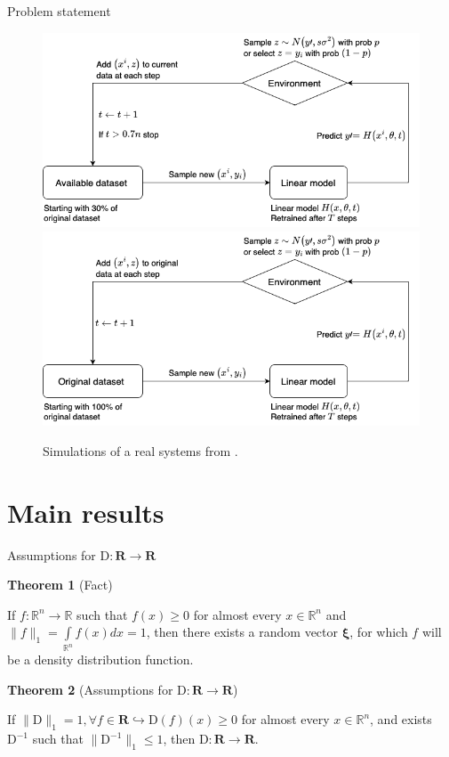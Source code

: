 \documentclass[aspectratio=169]{beamer}
\begin{document}
    \begin{frame}{Problem statement}
        \begin{figure}[h!]
            \centering
            \includegraphics[width=0.49\linewidth]{pictures/Hidden_loop.png}
            \includegraphics[width=0.49\linewidth]{pictures/Hidden_sample.png}\\
            
            \caption{Simulations of a real systems from \cite{khritankov2021hidden}.}
            \label{w}
        \end{figure}
        
    \end{frame}

\section{Main results}
    \begin{frame}{Assumptions for $\text{D}: \mathbf{R} \to \mathbf{R}$}

        \large{\textcolor{myNewColorA}{\textbf{Theorem 1} (Fact)}}
        \normalsize

        If $f: \mathbb{R}^n \to \mathbb{R}$ such that $f(x) \geq 0$ for almost every $x \in \mathbb{R}^n$ and $\|f\|_1 = \int\limits_{\mathbb{R}^n} f(x) dx = 1$, then there exists a random vector $\mathbf{\xi}$, for which $f$ will be a density distribution function.
        
        \large{\textcolor{myNewColorA}{\textbf{Theorem 2} (Assumptions for $\text{D}: \mathbf{R} \to \mathbf{R}$)}}
        \normalsize
    
        If $\|\text{D}\|_1 = 1, \forall f \in \mathbf{R} \hookrightarrow \text{D}(f)(x) \geq 0$ for almost every $x \in \mathbb{R}^n$, and exists $\text{D}^{-1}$ such that $\|\text{D}^{-1}\|_1 \leq 1$, then $\text{D} : \mathbf{R} \to \mathbf{R}$.\\
    \end{frame}
\end{document}
